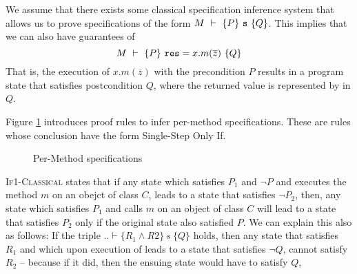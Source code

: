 We assume that there exists some classical specification
inference system  that allows us to prove 
specifications of the form  $M\ \vdash\ \{P\}\ {\texttt{s}}\ \{Q\}$. 
This implies that we can also have guarantees of  
$$M\ \vdash\ \{P\}\ {\texttt{res}} = x.m(\overline{z})\ \{Q\}$$
That is,   %
 the execution of $x.m(\overline{z})$ 
with the precondition $P$ results in a program state that 
satisfies postcondition $Q$, where the returned value is represented
by  in $Q$.

Figure \ref{f:classical->singlestep} introduces  %
proof rules to infer per-method \Nec specifications.
These are rules whose conclusion have the  form Single-Step Only If. 

\begin{figure}[t]
\footnotesize
{}
\caption{Per-Method \Nec specifications}
\label{f:classical->singlestep}
\end{figure}

 

 \textsc{If1-Classical} states that  
if any state which satisfies $P_1$ and $\neg P$ and executes  the method $m$ on an obejct of class $C$, leads to a state that satisfies $\neg P_2$, then, any state which satisfies $P_1$ and calls $m$ on an object of class $C$ will lead to a state that satisfies $P_2$ only if the original state also satisfied $P$.
We can explain this also as follows: If the triple $.. \vdash \{R_1 \wedge R2\}\ s\ \{Q\}$ holds, then any state that satisfies $R_1$ and which upon execution of  leads to a state that satisfies $\neg Q$, cannot satisfy $R_2$ -- because  if it did, then the ensuing state would have to satisfy $Q$,
 



